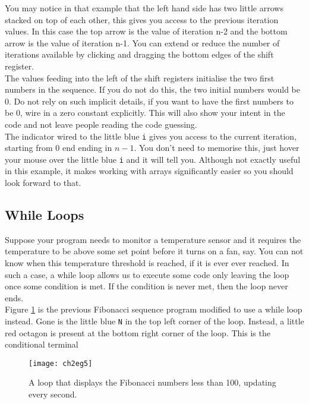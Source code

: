 You may notice in that example that the left hand side has two little arrows stacked on top of each other, this gives you access to the previous iteration values. In this case the top arrow is the value of iteration n-2 and the bottom arrow is the value of iteration n-1. You can extend or reduce the number of iterations available by clicking and dragging the bottom edges of the shift register.\\

The values feeding into the left of the shift registers initialise the two first numbers in the sequence. If you do not do this, the two initial numbers would be $0$. Do not rely on such implicit details, if you want to have the first numbers to be $0$, wire in a zero constant explicitly. This will also show your intent in the code and not leave people reading the code guessing.\\

The indicator wired to the little blue \texttt{i} gives you access to the current iteration, starting from $0$ end ending in $n-1$. You don't need to memorise this, just hover your mouse over the little blue \texttt{i} and it will tell you. Although not exactly useful in this example, it makes working with arrays significantly easier so you should look forward to that.\\

\subsection{While Loops}
Suppose your program needs to monitor a temperature sensor and it requires the temperature to be above some set point before it turns on a fan, say. You can not know when this temperature threshold is reached, if it is ever ever reached. In such a case, a while loop allows us to execute some code only leaving the loop once some condition is met. If the condition is never met, then the loop never ends.\\

Figure \ref{ch2eg5} is the previous Fibonacci sequence program modified to use a while loop instead. Gone is the little blue \texttt{N} in the top left corner of the loop. Instead, a little red octagon is present at the bottom right corner of the loop. This is the conditional terminal\\
\begin{figure}
	\centering
	\texttt{[image: ch2eg5]}
	\caption{A loop that displays the Fibonacci numbers less than 100, updating every second.}
	\label{ch2eg5}
\end{figure}

